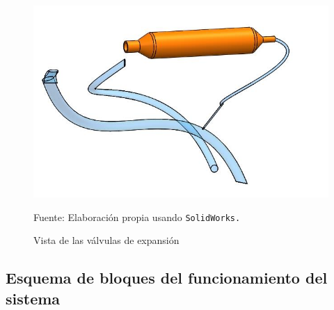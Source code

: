 \begin{figure}[H]
	\centering
	\includegraphics[width=0.5\linewidth]{figures/4-expvalves}
	\caption{Vista de las válvulas de expansión}
	Fuente: Elaboración propia usando \texttt{SolidWorks.}
	\label{fig:4-expvalves}
\end{figure}


\subsection{Esquema de bloques del funcionamiento del sistema}
 
